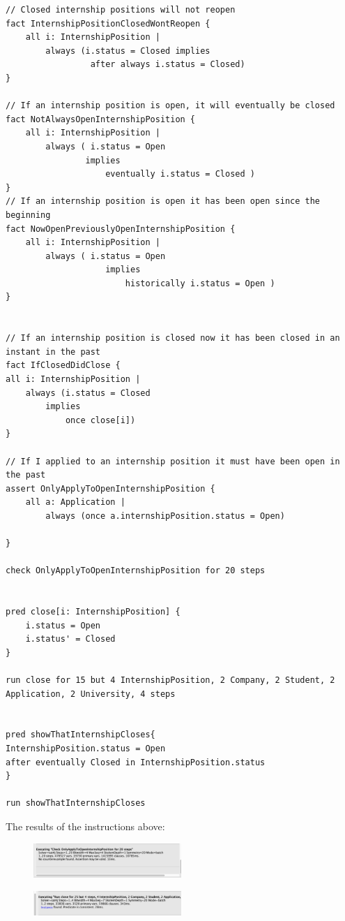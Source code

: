 \begin{verbatim}
// Closed internship positions will not reopen
fact InternshipPositionClosedWontReopen {
	all i: InternshipPosition | 
		always (i.status = Closed implies
				 after always i.status = Closed)
}

// If an internship position is open, it will eventually be closed
fact NotAlwaysOpenInternshipPosition {
    all i: InternshipPosition | 
        always ( i.status = Open
                implies 
                    eventually i.status = Closed )
}
// If an internship position is open it has been open since the beginning
fact NowOpenPreviouslyOpenInternshipPosition {
    all i: InternshipPosition | 
        always ( i.status = Open
                    implies 
                        historically i.status = Open )
}


// If an internship position is closed now it has been closed in an instant in the past
fact IfClosedDidClose {
all i: InternshipPosition |
    always (i.status = Closed
        implies 
            once close[i])
}

// If I applied to an internship position it must have been open in the past
assert OnlyApplyToOpenInternshipPosition { 
    all a: Application | 
        always (once a.internshipPosition.status = Open)
        
}

check OnlyApplyToOpenInternshipPosition for 20 steps


pred close[i: InternshipPosition] {
    i.status = Open
    i.status' = Closed
}

run close for 15 but 4 InternshipPosition, 2 Company, 2 Student, 2 Application, 2 University, 4 steps


pred showThatInternshipCloses{
InternshipPosition.status = Open
after eventually Closed in InternshipPosition.status
}

run showThatInternshipCloses
\end{verbatim}
The results of the instructions above:
\begin{figure}[h!]
    \centering\includegraphics[width=0.5\textwidth]{RASD/Images/Alloy/checkOnlyApplyToOpenInternshipPosition.png}
    \label{fig:checkOnlyApplyToOpenInternshipPosition}
\end{figure}
\begin{figure}[h!]
    \centering\includegraphics[width=0.5\textwidth]{RASD/Images/Alloy/predclose.png}
    \label{fig:predclose}
\end{figure}
